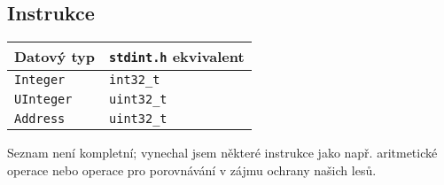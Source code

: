 \documentclass[10pt,a4paper]{article}
\begin{document}
\subsection{Instrukce}

\begin{center}
\begin{tabular}{ l l }
Datový typ & \verb"stdint.h" ekvivalent \\
\hline
\texttt{Integer}  & \verb"int32_t"  \\
\texttt{UInteger} & \verb"uint32_t" \\
\texttt{Address}  & \verb"uint32_t" \\
\end{tabular}
\end{center}

Seznam není kompletní; vynechal jsem některé instrukce jako např. aritmetické
operace nebo operace pro porovnávání v zájmu ochrany našich lesů.
\end{document}
